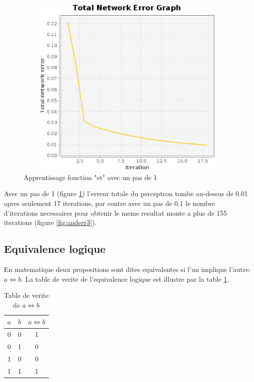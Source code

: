 \documentclass[twoside,openright,a4paper,11pt,french]{article}
\begin{document}
\begin{figure}[h]
\centering
\includegraphics[width=12cm,height=9cm]{./pics/and_error4.eps}
\caption{Apprentissage fonction "et" avec un pas de 1}
\label{fig:anderr4}
\end{figure}

Avec un pas de 1 (figure \ref{fig:anderr4}) l'erreur totale du perceptron
tombe au-dessus de 0.01 apres seulement 17 iterations, par contre avec 
un pas de 0.1 le nombre d'iterations necessaires pour obtenir le meme
resultat monte a plus de 155 iterations (figure \ref{fig:anderr3}).

\subsection{Equivalence logique}
En matematique deux propositions sont dites equivalentes si l'un implique
l'autre: $a \Leftrightarrow b$. La table de verite de l'equivalence logique
est illustre par la table \ref{tab:eq}.


\begin{table}[h]
  \centering
  \begin{tabular}{| c | c | c |}
    \hline
    \textbf{$a$} & \textbf{$b$} & \textbf{$a \Leftrightarrow b$}\\
    \hline
    0 & 0  & 1 \\
    \hline
    0 & 1  & 0 \\
    \hline
    1 & 0  & 0 \\
    \hline
    1 & 1  & 1 \\
    \hline
  \end{tabular}
  \caption{Table de verite de $a \Leftrightarrow b$}
  \label{tab:eq}
\end{table}
\end{document}
